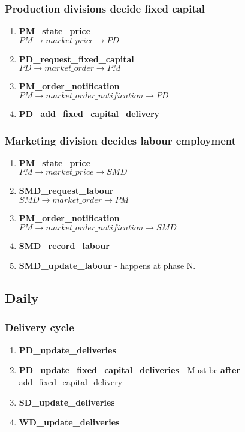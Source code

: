 \documentclass[11pt]{article}
\begin{document}
\subsubsection{Production divisions decide fixed capital}
\begin{enumerate}
	\item \textbf{PM\_state\_price} \\
	$ PM \rightarrow market\_price \rightarrow PD $
	\item \textbf{PD\_request\_fixed\_capital} \\
	$ PD \rightarrow market\_order \rightarrow PM $
	\item \textbf{PM\_order\_notification} \\
	$ PM \rightarrow market\_order\_notification \rightarrow PD $
	\item \textbf{PD\_add\_fixed\_capital\_delivery}
\end{enumerate}

\subsubsection{Marketing division decides labour employment}
\begin{enumerate}
	\item \textbf{PM\_state\_price} \\
	$ PM \rightarrow market\_price \rightarrow SMD $
	\item \textbf{SMD\_request\_labour} \\
	$ SMD \rightarrow market\_order \rightarrow PM $
	\item \textbf{PM\_order\_notification} \\
	$ PM \rightarrow market\_order\_notification \rightarrow SMD $
	\item \textbf{SMD\_record\_labour}
	\item \textbf{SMD\_update\_labour} - happens at phase N.
\end{enumerate}

\subsection{Daily}

\subsubsection{Delivery cycle}
\begin{enumerate}
	\item \textbf{PD\_update\_deliveries}
	\item \textbf{PD\_update\_fixed\_capital\_deliveries} - Must be \textbf{after} add\_fixed\_capital\_delivery
	\item \textbf{SD\_update\_deliveries}
	\item \textbf{WD\_update\_deliveries}
\end{enumerate}
\end{document}
